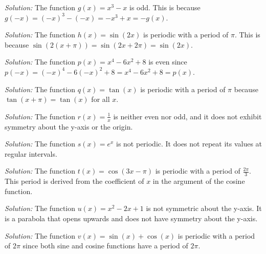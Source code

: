 \documentclass[a4paper,12pt]{book}
\newenvironment{solution}[1][]
{\par\noindent\textit{Solution:} \rmfamily}{\medskip}
\begin{document}
\begin{solution}[2]
The function \( g(x) = x^3 - x \) is odd. This is because \( g(-x) = (-x)^3 - (-x) = -x^3 + x = -g(x) \).
\end{solution}

\begin{solution}[3]
The function \( h(x) = \sin(2x) \) is periodic with a period of \( \pi \). This is because \(\sin(2(x + \pi)) = \sin(2x + 2\pi) = \sin(2x)\).
\end{solution}

\begin{solution}[4]
The function \( p(x) = x^4 - 6x^2 + 8 \) is even since \( p(-x) = (-x)^4 - 6(-x)^2 + 8 = x^4 - 6x^2 + 8 = p(x) \).
\end{solution}

\begin{solution}[5]
The function \( q(x) = \tan(x) \) is periodic with a period of \( \pi \) because \(\tan(x + \pi) = \tan(x)\) for all \(x\).
\end{solution}

\begin{solution}[6]
The function \( r(x) = \frac{1}{x} \) is neither even nor odd, and it does not exhibit symmetry about the y-axis or the origin.
\end{solution}

\begin{solution}[7]
The function \( s(x) = e^x \) is not periodic. It does not repeat its values at regular intervals.
\end{solution}

\begin{solution}[8]
The function \( t(x) = \cos(3x - \pi) \) is periodic with a period of \( \frac{2\pi}{3} \). This period is derived from the coefficient of \(x\) in the argument of the cosine function.
\end{solution}

\begin{solution}[9]
The function \( u(x) = x^2 - 2x + 1 \) is not symmetric about the y-axis. It is a parabola that opens upwards and does not have symmetry about the y-axis.
\end{solution}

\begin{solution}[10]
The function \( v(x) = \sin(x) + \cos(x) \) is periodic with a period of \( 2\pi \) since both sine and cosine functions have a period of \( 2\pi \).
\end{solution}
\end{document}
